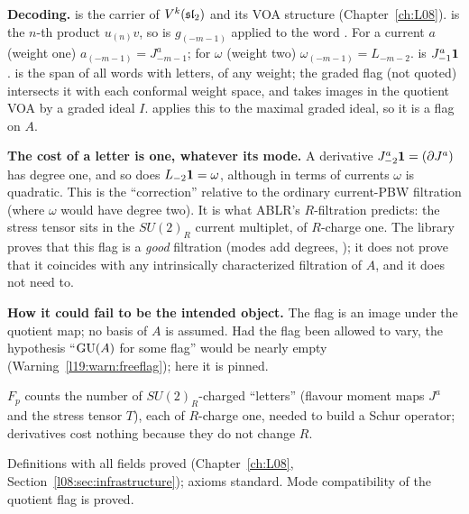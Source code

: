 \begin{dictionary}
\textbf{Decoding.}  is the carrier of $V^k(\mathfrak{sl}_2)$ and  its VOA
structure (Chapter~\ref{ch:L08}).  is the $n$-th product $u_{(n)}v$, so
 is $g_{(-m-1)}$ applied to the word . For a current $a$ (weight one)
$a_{(-m-1)}=J^a_{-m-1}$; for $\omega$ (weight two) $\omega_{(-m-1)}=L_{-m-2}$.  is $J^a_{-1}\mathbf 1$.
 is the span of all words with  letters, of any weight; the graded
flag  (not quoted) intersects it with each conformal weight space, and 
takes images in the quotient VOA by a graded ideal $I$.  applies this to the maximal graded ideal, so it is a
flag on $A$.

\textbf{The cost of a letter is one, whatever its mode.} A derivative $J^a_{-2}\mathbf 1=(\partial J^a)$ has degree one,
and so does $L_{-2}\mathbf 1=\omega$, although in terms of currents $\omega$ is quadratic. This is the
``correction'' relative to the ordinary current-PBW filtration (where $\omega$ would have degree two). It is what ABLR's
$R$-filtration predicts: the stress tensor sits in the $SU(2)_R$ current multiplet, of $R$-charge one. The library proves that
this flag is a \emph{good} filtration (modes add degrees, ); it does not
prove that it coincides with any intrinsically characterized filtration of $A$, and it does not need to.

\textbf{How it could fail to be the intended object.} The flag is an image under the quotient map; no basis of $A$ is assumed.
Had the flag been allowed to vary, the hypothesis ``$\mathrm{GU}(A)$ for some flag'' would be nearly empty
(Warning~\ref{l19:warn:freeflag}); here it is pinned.
\end{dictionary}

\begin{physics}
$F_p$ counts the number of $SU(2)_R$-charged ``letters'' (flavour moment maps $J^a$ and the stress tensor $T$), each of
$R$-charge one, needed to build a Schur operator; derivatives cost nothing because they do not change $R$.
\end{physics}

\begin{status}
Definitions with all  fields proved (Chapter~\ref{ch:L08}, Section~\ref{l08:sec:infrastructure}); axioms
standard. Mode compatibility of the quotient flag is proved.
\end{status}

